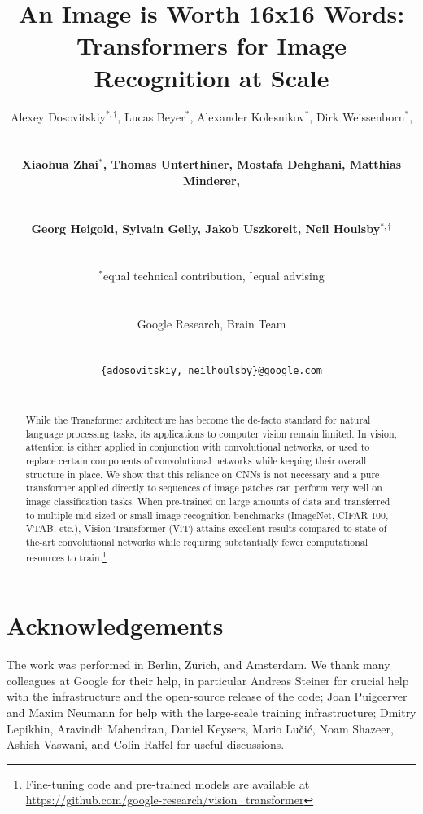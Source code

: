 \documentclass{article} %
\title{An Image is Worth 16x16 Words:\\ Transformers for Image Recognition at Scale}
\author{
\centerline{Alexey Dosovitskiy$^{*,\dagger}$, Lucas Beyer$^{*}$, Alexander Kolesnikov$^{*}$, Dirk Weissenborn$^{*}$,} \vspace{1mm}\\
\centerline{\textbf{Xiaohua Zhai$^{*}$, Thomas Unterthiner, Mostafa Dehghani, Matthias Minderer,}} \vspace{0.5mm} \\
\centerline{\textbf{Georg Heigold, Sylvain Gelly, Jakob Uszkoreit, Neil Houlsby$^{*,\dagger}$}} \vspace{0.7mm} \\
\centerline{$^*$equal technical contribution, $^\dagger$equal advising}  \vspace{0.7mm} \\
\centerline{Google Research, Brain Team}  \vspace{0.8mm} \\
\centerline{\texttt{\{adosovitskiy, neilhoulsby\}@google.com}} \\
}
\newcommand{\oursabbrv}{ViT\xspace}
\newcommand{\oursfull}{Vision Transformer\xspace}
\newcommand{\imagenet}{ImageNet\xspace}
\begin{document}
\maketitle

\begin{abstract}
While the Transformer architecture has become the de-facto standard for natural language processing tasks, its applications to computer vision remain limited.
In vision, attention is either applied in conjunction with convolutional networks, or used to replace certain components of convolutional networks while keeping their overall structure in place.
We show that this reliance on CNNs is not necessary and a pure transformer applied directly to sequences of image patches can perform very well on image classification tasks.
When pre-trained on large amounts of data and transferred to multiple mid-sized or small image recognition benchmarks (\imagenet, CIFAR-100, VTAB, etc.), \oursfull{} (\oursabbrv) attains excellent results compared to state-of-the-art convolutional networks while requiring substantially fewer computational resources to train.\footnote{Fine-tuning code and pre-trained models are available at \url{https://github.com/google-research/vision_transformer}}


\end{abstract}







\section*{Acknowledgements}
The work was performed in Berlin, Z\"urich, and Amsterdam. We thank many colleagues at Google for their help, in particular Andreas Steiner for crucial help with the infrastructure and the open-source release of the code; Joan Puigcerver and Maxim Neumann for help with the large-scale training infrastructure; Dmitry Lepikhin, Aravindh Mahendran, Daniel Keysers, Mario Lu\v{c}i\'{c}, Noam Shazeer, Ashish Vaswani, and Colin Raffel for useful discussions.





\newpage

\end{document}
